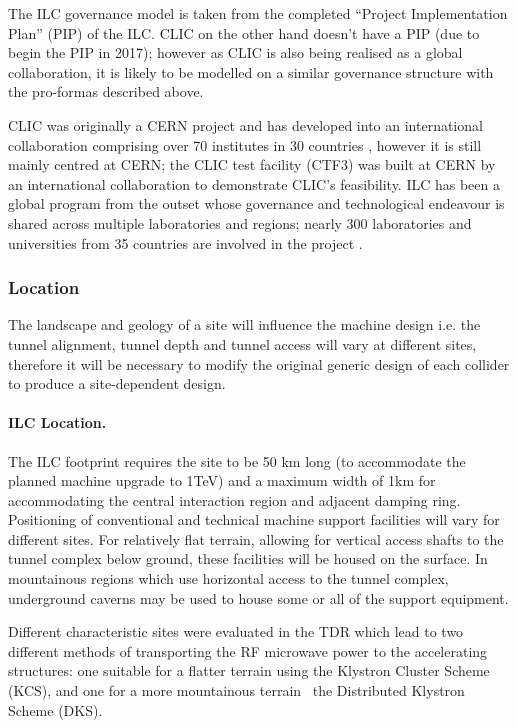 The ILC governance model is taken from the completed ``Project Implementation Plan'' (PIP) of the ILC. CLIC on the other hand doesn't have a PIP (due to begin the PIP in 2017); however as CLIC is also being realised as a global collaboration, it is likely to be modelled on a similar governance structure with the pro-formas described above.

CLIC was originally a CERN project and has developed into an international collaboration comprising over 70 institutes in 30 countries \cite{CLIC:Organisation}, however it is still mainly centred at CERN; the CLIC test facility (CTF3) was built at CERN by an international collaboration to demonstrate CLIC's feasibility. ILC has been a global program from the outset whose governance and technological endeavour is shared across multiple laboratories and regions; nearly 300 laboratories and universities from 35 countries are involved in the project \cite{ILC:Collab}.

\subsubsection{Location}

The landscape and geology of a site will influence the machine design i.e. the tunnel alignment, tunnel depth and tunnel access will vary at different sites, therefore it will be necessary to modify the original generic design of each collider to produce a site-dependent design.

\paragraph{ILC Location.}

The ILC footprint requires the site to be 50 km long (to accommodate the planned machine upgrade to 1TeV) and a maximum width of 1km for accommodating the central interaction region and adjacent damping ring. Positioning of conventional and technical machine support facilities will vary for different sites. For relatively flat terrain, allowing for vertical access shafts to the tunnel complex below ground, these facilities will be housed on the surface. In mountainous regions which use horizontal access to the tunnel complex, underground caverns may be used to house some or all of the support equipment. \cite{ILC:PIPReport}

Different characteristic sites were evaluated in the TDR which lead to two different methods of transporting the RF microwave power to the accelerating structures: one suitable for a flatter terrain using the Klystron Cluster Scheme (KCS), and one for a more mountainous terrain \textemdash \, the Distributed Klystron Scheme (DKS). \cite{ILC:TechnicalDesignReport}


